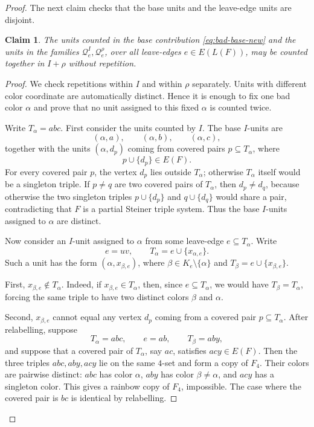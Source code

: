 \documentclass[10pt,a4paper]{amsart}
\newtheorem{claim}{Claim}
\begin{document}
\begin{proof}
    The next claim checks that the base units and the leave-edge units are disjoint.

    \begin{claim}\label{clm:bad-disjoint-new}
        The units counted in the base contribution
        \eqref{eq:bad-base-new} and the units in the families
        $\mathcal Q_e^I,\mathcal Q_e^\rho$, over all leave-edges
        $e\in E(L(F))$, may be counted together in $I+\rho$ without
        repetition.
    \end{claim}

    \begin{proof}
        We check repetitions within $I$ and within $\rho$ separately.  Units
        with different color coordinate are automatically distinct.  Hence it
        is enough to fix one bad color $\alpha$ and prove that no unit
        assigned to this fixed $\alpha$ is counted twice.

        Write $T_\alpha=abc$.
        First consider the units counted by $I$.  The base $I$-units are
        \[
            (\alpha,a),\qquad (\alpha,b),\qquad (\alpha,c),
        \]
        together with the units $(\alpha,d_p)$ coming from covered pairs
        $p\subseteq T_\alpha$, where
        \[
            p\cup\{d_p\}\in E(F).
        \]
        For every covered pair $p$, the vertex $d_p$ lies outside
        $T_\alpha$; otherwise $T_\alpha$ itself would be a singleton triple.
        If $p\ne q$ are two covered pairs of $T_\alpha$, then
        $d_p\ne d_q$, because otherwise the two singleton triples $p\cup\{d_p\}$ and $q\cup\{d_q\}$ would share a pair, contradicting that $F$ is a partial Steiner triple
        system.  Thus the base $I$-units assigned to $\alpha$ are distinct.

        Now consider an $I$-unit assigned to $\alpha$ from some leave-edge
        $e\subseteq T_\alpha$.  Write
        \[
            e=uv,
            \qquad
            T_\alpha=e\cup\{x_{\alpha,e}\}.
        \]
        Such a unit has the form $(\alpha,x_{\beta,e})$, where $\beta\in K_e\setminus\{\alpha\}$ and $T_\beta=e\cup\{x_{\beta,e}\}$.

        First, $x_{\beta,e}\notin T_\alpha$.  Indeed, if
        $x_{\beta,e}\in T_\alpha$, then, since $e\subseteq T_\alpha$, we
        would have $T_\beta=T_\alpha$,
        forcing the same triple to have two distinct colors $\beta$ and
        $\alpha$.

        Second, $x_{\beta,e}$ cannot equal any vertex $d_p$ coming from a
        covered pair $p\subseteq T_\alpha$.  After relabelling, suppose
        \[
            T_\alpha=abc,\qquad e=ab,\qquad T_\beta=aby,
        \]
        and suppose that a covered pair of $T_\alpha$, say $ac$, satisfies $acy\in E(F)$.
        Then the three triples $abc,aby,acy$ lie on the same $4$-set and form a copy of $F_4$.
        Their colors are pairwise distinct: $abc$ has color $\alpha$, $aby$ has color $\beta\ne\alpha$, and $acy$ has a singleton color.
        This gives a rainbow copy of $F_4$, impossible.
        The case where the covered pair is $bc$ is identical by relabelling.


\end{proof}
\end{proof}
\end{document}
